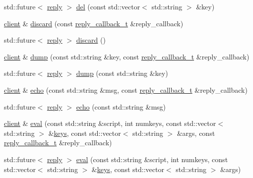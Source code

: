\begin{DoxyCompactItemize}
\item 
std\+::future$<$ \hyperlink{classcpp__redis_1_1reply}{reply} $>$ \hyperlink{classcpp__redis_1_1client_a99c090de7e23accfaf3b93f4b025d2e9}{del} (const std\+::vector$<$ std\+::string $>$ \&key)
\item 
\hyperlink{classcpp__redis_1_1client}{client} \& \hyperlink{classcpp__redis_1_1client_a0f5a07744750f87504f72dcf66144a24}{discard} (const \hyperlink{classcpp__redis_1_1client_a061a1140d36d2eaeda82b09a0bb3f9f2}{reply\+\_\+callback\+\_\+t} \&reply\+\_\+callback)
\item 
std\+::future$<$ \hyperlink{classcpp__redis_1_1reply}{reply} $>$ \hyperlink{classcpp__redis_1_1client_ab37e125f4f94bfa9455dc29f64698e47}{discard} ()
\item 
\hyperlink{classcpp__redis_1_1client}{client} \& \hyperlink{classcpp__redis_1_1client_aed6bb7657acdd4ea4dd0a4e7ec3eec20}{dump} (const std\+::string \&key, const \hyperlink{classcpp__redis_1_1client_a061a1140d36d2eaeda82b09a0bb3f9f2}{reply\+\_\+callback\+\_\+t} \&reply\+\_\+callback)
\item 
std\+::future$<$ \hyperlink{classcpp__redis_1_1reply}{reply} $>$ \hyperlink{classcpp__redis_1_1client_aa25f7f2648c1a013ce079ef13e8e2f0f}{dump} (const std\+::string \&key)
\item 
\hyperlink{classcpp__redis_1_1client}{client} \& \hyperlink{classcpp__redis_1_1client_a285d35a355052ae1757d13ecec0539e8}{echo} (const std\+::string \&msg, const \hyperlink{classcpp__redis_1_1client_a061a1140d36d2eaeda82b09a0bb3f9f2}{reply\+\_\+callback\+\_\+t} \&reply\+\_\+callback)
\item 
std\+::future$<$ \hyperlink{classcpp__redis_1_1reply}{reply} $>$ \hyperlink{classcpp__redis_1_1client_af0e3462a35f72aeae1527f0cb3cc8570}{echo} (const std\+::string \&msg)
\item 
\hyperlink{classcpp__redis_1_1client}{client} \& \hyperlink{classcpp__redis_1_1client_aeb773d0e0cacb766a0c4c7641bd91ebf}{eval} (const std\+::string \&script, int numkeys, const std\+::vector$<$ std\+::string $>$ \&\hyperlink{classcpp__redis_1_1client_acb7845a206b2321e6919c2f38282c322}{keys}, const std\+::vector$<$ std\+::string $>$ \&args, const \hyperlink{classcpp__redis_1_1client_a061a1140d36d2eaeda82b09a0bb3f9f2}{reply\+\_\+callback\+\_\+t} \&reply\+\_\+callback)
\item 
std\+::future$<$ \hyperlink{classcpp__redis_1_1reply}{reply} $>$ \hyperlink{classcpp__redis_1_1client_a01b328b664e5cf604150e3d0f881ff4c}{eval} (const std\+::string \&script, int numkeys, const std\+::vector$<$ std\+::string $>$ \&\hyperlink{classcpp__redis_1_1client_acb7845a206b2321e6919c2f38282c322}{keys}, const std\+::vector$<$ std\+::string $>$ \&args)

\end{DoxyCompactItemize}
